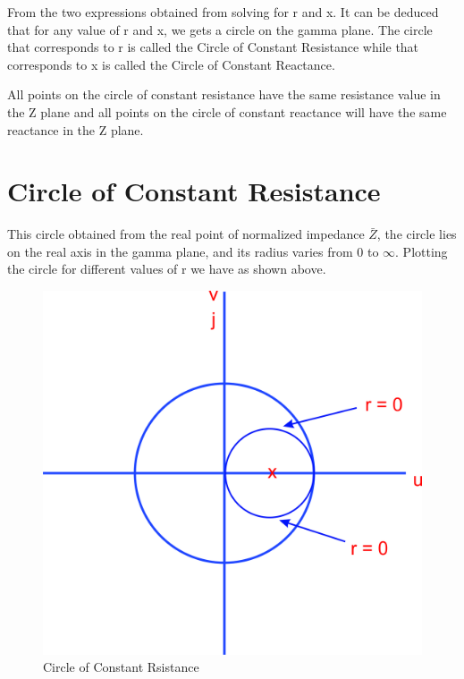 From the two expressions obtained from solving for r and x.  It can be deduced that for any value of r and x, we gets a circle on the gamma plane. The circle that corresponds to r is called the Circle of Constant Resistance while that corresponds to x is called the Circle of Constant Reactance.

All points on the circle of constant resistance have the same resistance value in the Z plane and all points on the circle of constant reactance will have the same reactance in the Z plane.

\section{Circle of Constant Resistance}
This circle  obtained from the real point of normalized impedance $ \bar{Z} $, the circle lies on the real axis in the gamma plane, and its radius varies from 0 to $\infty$. Plotting the circle for different values of r we have as shown above.
\begin{figure}[h]
\centering
\includegraphics[width=0.5\linewidth]{./graphics/ouytre}
\caption{Circle of Constant Rsistance}
\label{fig:ouytre}
\end{figure}

